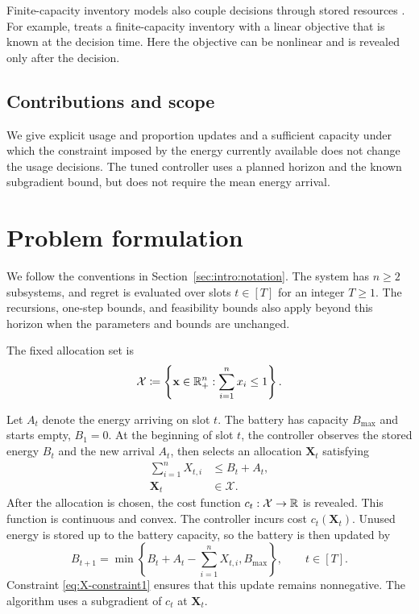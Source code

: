 Finite-capacity inventory models also couple decisions through stored resources
\cite{yang2020online,lin2019competitive,chau2016cost,neely-inventory-control-cdc2010}.
For example, \cite{yang2020online} treats a finite-capacity inventory with a
linear objective that is known at the decision time. Here the objective
can be nonlinear and is revealed only after the decision.

\subsection{Contributions and scope}

We give explicit usage and proportion updates and a sufficient capacity
under which the constraint imposed by the energy currently available
does not change the usage decisions.
The tuned controller uses a planned horizon and the known
subgradient bound, but does not require the mean energy arrival.

\section{Problem formulation}
\label{sec:energy:problem}

We follow the conventions in Section~\ref{sec:intro:notation}. The system
has $n\geq2$ subsystems, and regret is evaluated over slots $t\in[T]$ for
an integer $T\geq1$. The recursions, one-step bounds, and feasibility bounds
also apply beyond this horizon when the parameters and bounds are unchanged.

The fixed allocation set is
\begin{equation}\label{eq:X-set}
\mathcal{X}\coloneqq\left\{\mathbf{x}\in\mathbb{R}_+^n:
\sum_{i=1}^n x_i\leq1\right\}.
\end{equation}

Let $A_t$ denote the energy arriving on slot $t$. The battery has
capacity $B_{\mathrm{max}}$ and starts empty, $B_1=0$. At the beginning of
slot $t$, the controller observes the stored energy $B_t$ and the
new arrival $A_t$, then selects an allocation $\mathbf{X}_t$ satisfying
\begin{align}
\sum_{i=1}^n X_{t,i}&\leq B_t+A_t,
\label{eq:X-constraint1}\\
\mathbf{X}_t&\in\mathcal X.\label{eq:X-constraint2}
\end{align}
After the allocation is chosen, the cost function
$c_t:\mathcal X\to\mathbb{R}$ is revealed. This function is continuous and convex.
The controller incurs cost $c_t(\mathbf{X}_t)$. Unused energy is stored up
to the battery capacity, so the battery is then updated by
\begin{equation}\label{eq:B-update}
    B_{t+1}=\min\left\{B_t+A_t-\sum_{i=1}^n X_{t,i},
                    B_{\mathrm{max}}\right\},
    \qquad t\in[T].
\end{equation}
Constraint \eqref{eq:X-constraint1} ensures that this update remains nonnegative.
The algorithm uses a subgradient of $c_t$ at $\mathbf{X}_t$.

